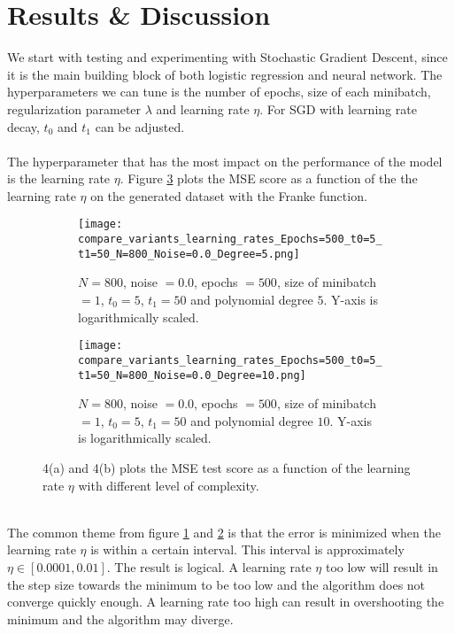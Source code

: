 \documentclass[a4paper,twocolumn]{article}
\begin{document}
\section{Results \& Discussion}
We start with testing and experimenting with Stochastic Gradient Descent, since it is the main building block of both logistic regression and neural network. The hyperparameters we can tune is the number of epochs, size of each minibatch, regularization parameter $\lambda$ and learning rate $\eta$. For SGD with learning rate decay, $t_{0}$ and $t_{1}$ can be adjusted.\\
\\
The hyperparameter that has the most impact on the performance of the model is the learning rate $\eta$. Figure \ref{fig:4} plots the MSE score as a function of the the learning rate $\eta$ on the generated dataset with the Franke function.\\
\begin{figure}[ht]
    \centering
    \begin{subfigure}[b]{0.9\columnwidth}
        \texttt{[image: compare\_variants\_learning\_rates\_Epochs=500\_t0=5\_t1=50\_N=800\_Noise=0.0\_Degree=5.png]}
        \caption{$N = 800$, noise $= 0.0$, epochs $= 500$, size of minibatch $= 1$, $t_{0} = 5$, $t_{1} = 50$ and polynomial degree $5$. Y-axis is logarithmically scaled.}
        \label{fig:4a}
    \end{subfigure}
    
    \begin{subfigure}[b]{0.9\columnwidth}
        \texttt{[image: compare\_variants\_learning\_rates\_Epochs=500\_t0=5\_t1=50\_N=800\_Noise=0.0\_Degree=10.png]}
        \caption{$N = 800$, noise $= 0.0$, epochs $= 500$, size of minibatch $= 1$, $t_{0} = 5$, $t_{1} = 50$ and polynomial degree $10$. Y-axis is logarithmically scaled.}
        \label{fig:4b}
    \end{subfigure}
    \caption{4(a) and 4(b) plots the MSE test score as a function of the learning rate $\eta$ with different level of complexity.}
    \label{fig:4}
\end{figure}\\
The common theme from figure \ref{fig:4a} and \ref{fig:4b} is that the error is minimized when the learning rate $\eta$ is within a certain interval. This interval is approximately $\eta \in [0.0001, 0.01]$. The result is logical. A learning rate $\eta$ too low will result in the step size towards the minimum to be too low and the algorithm does not converge quickly enough. A learning rate too high can result in overshooting the minimum and the algorithm may diverge.\\
\end{document}
